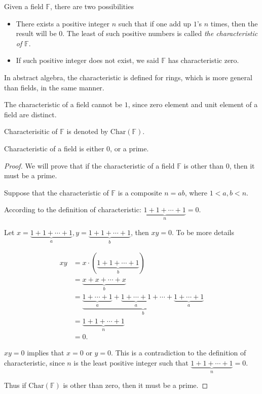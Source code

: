 \begin{definition}
	Given a field $\mathbb{F}$, there are two possibilities
	\begin{itemize}
		\item There exists a positive integer $n$ such that if one add up $1$'s $n$ times, then the result will be $0$. The least of such positive numbers is called \textit{the characteristic of $\mathbb{F}$}.
		\item If such positive integer does not exist, we said $\mathbb{F}$ has characteristic zero.
	\end{itemize}
\end{definition}

\begin{note}
	In abstract algebra, the characteristic is defined for rings, which is more general than fields, in the same manner.

	The characteristic of a field cannot be $1$, since zero element and unit element of a field are distinct.

	Characterisitic of $\mathbb{F}$ is denoted by $\text{Char}(\mathbb{F})$.
\end{note}

\begin{theorem}
	Characteristic of a field is either $0$, or a prime.
\end{theorem}

\begin{proof}
	We will prove that if the characteristic of a field $\mathbb{F}$ is other than $0$, then it must be a prime.

	Suppose that the characteristic of $\mathbb{F}$ is a composite $n = ab$, where $1 < a, b < n$.

	According to the definition of characteristic: $\underbrace{1 + 1 + \cdots + 1}_{n} = 0$.

	Let $x = \underbrace{1 + 1 + \cdots + 1}_{a}, y = \underbrace{1 + 1 + \cdots + 1}_{b}$, then $xy = 0$. To be more details

	\begin{align*}
		xy & = x\cdot (\underbrace{1 + 1 + \cdots + 1}_{b})                                                                                  \\
		   & = \underbrace{x + x + \cdots + x}_{b}                                                                                           \\
		   & = \underbrace{\underbrace{1 + \cdots + 1}_{a} + \underbrace{1 + \cdots + 1}_{a} + \cdots + \underbrace{1 + \cdots + 1}_{a}}_{b} \\
		   & = \underbrace{1 + 1 + \cdots + 1}_{n}                                                                                           \\
		   & = 0.
	\end{align*}

	$xy = 0$ implies that $x = 0$ or $y = 0$. This is a contradiction to the definition of characteristic, since $n$ is the least positive integer such that $\underbrace{1 + 1 + \cdots + 1}_{n} = 0$.

	Thus if $\text{Char}(\mathbb{F})$ is other than zero, then it must be a prime.
\end{proof}

